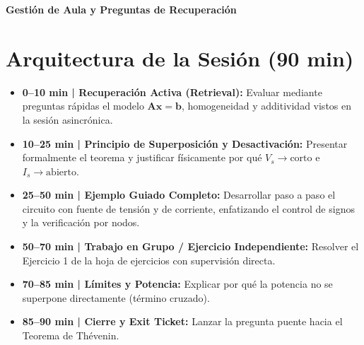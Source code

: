 \documentclass[11pt, a4paper]{article}
\begin{document}
\begin{tcolorbox}[colback=ucbblue!5!white, colframe=ucbblue, title=\textbf{Notas del Instructor: Transición y Evaluación Formativa (Semana 6)}]
    \centering \large \textbf{Gestión de Aula y Preguntas de Recuperación}
\end{tcolorbox}

\section*{Arquitectura de la Sesión (90 min)}
\begin{itemize}
    \item \textbf{0–10 min | Recuperación Activa (Retrieval):} Evaluar mediante preguntas rápidas el modelo $\bm{A}\bm{x} = \bm{b}$, homogeneidad y additividad vistos en la sesión asincrónica.
    \item \textbf{10–25 min | Principio de Superposición y Desactivación:} Presentar formalmente el teorema y justificar físicamente por qué $V_s \rightarrow \text{corto}$ e $I_s \rightarrow \text{abierto}$.
    \item \textbf{25–50 min | Ejemplo Guiado Completo:} Desarrollar paso a paso el circuito con fuente de tensión y de corriente, enfatizando el control de signos y la verificación por nodos.
    \item \textbf{50–70 min | Trabajo en Grupo / Ejercicio Independiente:} Resolver el Ejercicio 1 de la hoja de ejercicios con supervisión directa.
    \item \textbf{70–85 min | Límites y Potencia:} Explicar por qué la potencia no se superpone directamente (término cruzado).
    \item \textbf{85–90 min | Cierre y Exit Ticket:} Lanzar la pregunta puente hacia el Teorema de Thévenin.
\end{itemize}
\end{document}
